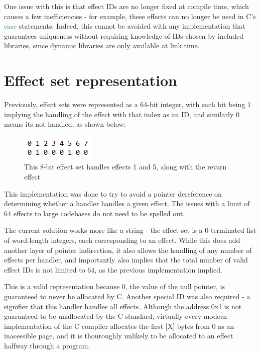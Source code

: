 \documentclass[logo,bsc,singlespacing,parskip,online]{infthesis}
\begin{document}
One issue with this is that effect IDs are no longer fixed at compile time, which causes a few inefficiencies - for example, these effects can no longer be used in C's \textcolor{teal}{case} statements. Indeed, this cannot be avoided with any implementation that guarantees uniqueness without requiring knowledge of IDs chosen by included libraries, since dynamic libraries are only available at link time.

\section{Effect set representation}

Previously, effect sets were represented as a 64-bit integer, with each bit being 1 implying the handling of the effect with that index as an ID, and similarly 0 means its not handled, as shown below: 

\begin{figure}[h]
    \centering
    \includegraphics[width=0.3\linewidth]{effect_set.png}
    \caption{This 8-bit effect set handles effects 1 and 5, along with the return effect}
\end{figure}

This implementation was done to try to avoid a pointer dereference on determining whether a handler handles a given effect. The issues with a limit of 64 effects to large codebases do not need to be spelled out.

The current solution works more like a string - the effect set is a 0-terminated list of word-length integers, each corresponding to an effect. While this does add another layer of pointer indirection, it also allows the handling of any number of effects per handler, and importantly also implies that the total number of valid effect IDs is not limited to 64, as the previous implementation implied.

This is a valid representation because 0, the value of the null pointer, is guaranteed to never be allocated by C. Another special ID was also required - a signifier that this handler handles all effects. Although the address 0x1 is not guaranteed to be unallocated by the C standard, virtually every modern implementation of the C compiler allocates the first [X] bytes from 0 as an inacessible page, and it is thouroughly unlikely to be allocated to an effect halfway through a program.
\end{document}
